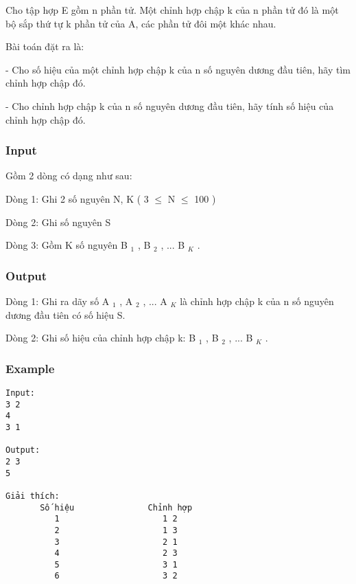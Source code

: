 



   Cho tập hợp E gồm n phần tử. Một chỉnh hợp chập k  của n phần tử đó là một bộ sắp thứ tự k phần tử của A, các phần tử đôi một khác nhau.  

   Bài toán đặt ra là:  

   - Cho số hiệu của một chỉnh hợp chập k của n số nguyên dương đầu tiên, hãy tìm chỉnh hợp chập đó.  

   - Cho chỉnh hợp chập k của n số nguyên dương đầu tiên, hãy tính số hiệu của chỉnh hợp chập đó.  

\subsubsection{   Input  }

   Gồm 2 dòng có dạng như sau:  

   Dòng 1: Ghi 2 số nguyên N, K ( 3  $\le$  N  $\le$  100 )  

   Dòng 2: Ghi số nguyên S  

   Dòng 3: Gồm K số nguyên B   $_    1   $   , B   $_    2   $   , ... B   $_    K   $   .  

\subsubsection{   Output  }

   Dòng 1: Ghi ra dãy số A   $_    1   $   , A   $_    2   $   , ... A   $_    K   $   là chỉnh hợp chập k của n số nguyên dương đầu tiên có số hiệu S.  

   Dòng 2: Ghi số hiệu của chỉnh hợp chập k: B   $_    1   $   , B   $_    2   $   , ... B   $_    K   $   .  

\subsubsection{   Example  }
\begin{verbatim}
Input:
3 2 
4
3 1

Output:
2 3
5

Giải thích:
       Số hiệu               Chỉnh hợp
          1                     1 2
          2                     1 3
          3                     2 1
          4                     2 3
          5                     3 1
          6                     3 2

\end{verbatim}
